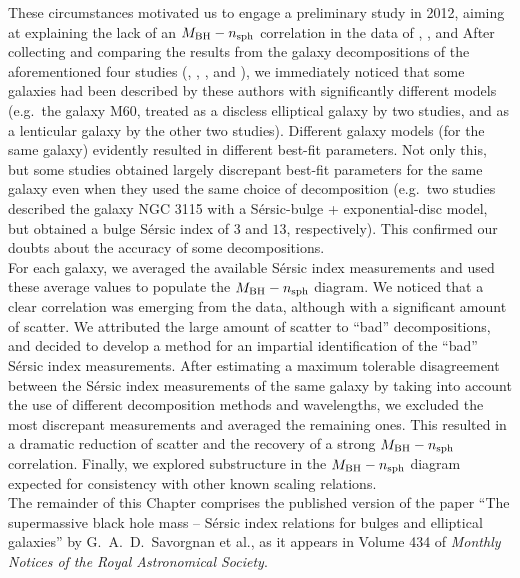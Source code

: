 These circumstances motivated us to engage a preliminary study in 2012, 
aiming at explaining the lack of an $M_{\rm BH} - n_{\rm sph}$ correlation 
in the data of \citeauthor{sani2011}, \citeauthor{vika2012}, and \citeauthor{beifiori2012} 
After collecting and comparing the results from the galaxy decompositions 
of the aforementioned four studies (\citeauthor{grahamdriver2007}, \citeauthor{sani2011}, 
\citeauthor{vika2012}, and \citeauthor{beifiori2012}), 
we immediately noticed that some galaxies had been described by these authors with significantly different models 
(e.g.~the galaxy M60, treated as a discless elliptical galaxy by two studies, 
and as a lenticular galaxy by the other two studies). 
Different galaxy models (for the same galaxy) evidently resulted in different best-fit parameters. 
Not only this, but some studies obtained largely discrepant best-fit parameters 
for the same galaxy even when they used the same choice of decomposition 
(e.g.~two studies described the galaxy NGC 3115 with a S\'ersic-bulge + exponential-disc model, 
but obtained a bulge S\'ersic index of $3$ and $13$, respectively). 
This confirmed our doubts about the accuracy of some decompositions. \\

For each galaxy, we averaged the available S\'ersic index measurements 
and used these average values to populate the $M_{\rm BH} - n_{\rm sph}$ diagram. 
We noticed that a clear correlation was emerging from the data, 
although with a significant amount of scatter. 
We attributed the large amount of scatter to ``bad'' decompositions, 
and decided to develop a method for an impartial identification of the ``bad'' S\'ersic index measurements. 
After estimating a maximum tolerable disagreement between the S\'ersic index measurements of the same galaxy 
by taking into account the use of different decomposition methods and wavelengths, 
we excluded the most discrepant measurements and averaged the remaining ones. 
This resulted in a dramatic reduction of scatter 
and the recovery of a strong $M_{\rm BH} - n_{\rm sph}$ correlation. 
Finally, we explored substructure in the $M_{\rm BH} - n_{\rm sph}$ diagram 
expected for consistency with other known scaling relations. \\

The remainder of this Chapter comprises the published version of the paper 
``The supermassive black hole mass -- S\'ersic index relations for bulges and elliptical galaxies''
by G.~A.~D.~Savorgnan et al., 
as it appears in Volume 434 of \emph{Monthly Notices of the Royal Astronomical Society}. 



